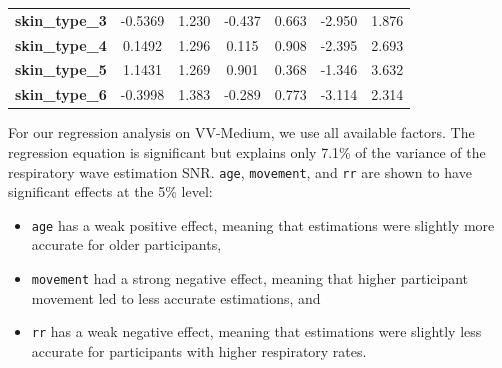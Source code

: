 \documentclass{article}
\begin{document}
\begin{table}[h!]
\begin{center}
\begin{tabular}{lcccccc}
\textbf{skin\_type\_3}  			 &      -0.5369  &        1.230     &    -0.437  &         0.663        &       -2.950    &        1.876     \\
\textbf{skin\_type\_4}  			 &       0.1492  &        1.296     &     0.115  &         0.908        &       -2.395    &        2.693     \\
\textbf{skin\_type\_5}  			 &       1.1431  &        1.269     &     0.901  &         0.368        &       -1.346    &        3.632     \\
\textbf{skin\_type\_6}  			 &      -0.3998  &        1.383     &    -0.289  &         0.773        &       -3.114    &        2.314     \\
\bottomrule
\end{tabular}
\end{center}
\end{table}

For our regression analysis on VV-Medium, we use all available factors.
The regression equation is significant but explains only 7.1\% of the variance of the respiratory wave estimation SNR.
\texttt{age}, \texttt{movement}, and \texttt{rr} are shown to have significant effects at the 5\% level:

\begin{itemize}
	\item \texttt{age} has a weak positive effect, meaning that estimations were slightly more accurate for older participants,
	\item \texttt{movement} had a strong negative effect, meaning that higher participant movement led to less accurate estimations, and
	\item \texttt{rr} has a weak negative effect, meaning that estimations were slightly less accurate for participants with higher respiratory rates.
\end{itemize}
\end{document}
